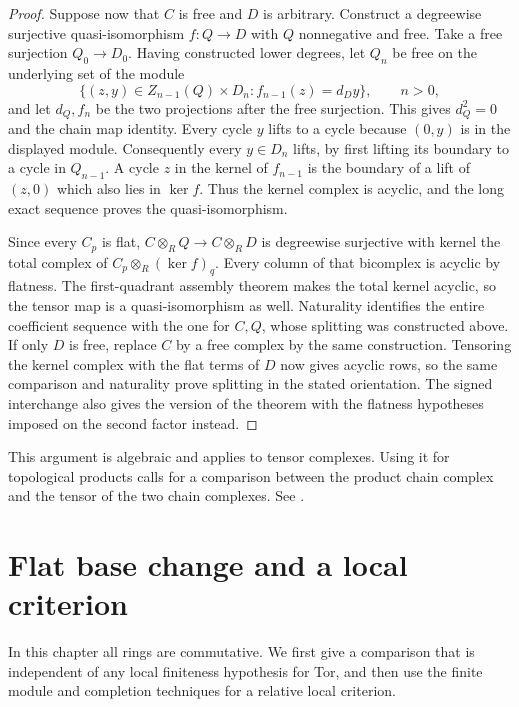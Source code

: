 \documentclass[11pt,oneside,openany]{book}
\theoremstyle{definition}
\theoremstyle{remark}
\begin{document}
\begin{proof}
Suppose now that \(C\) is free and \(D\) is arbitrary.
Construct a degreewise surjective quasi-isomorphism
\(f:Q\to D\) with \(Q\) nonnegative and free.
Take a free surjection \(Q_0\to D_0\). Having constructed
lower degrees, let \(Q_n\) be free on the underlying
set of the module
\[
 \{(z,y)\in Z_{n-1}(Q)\times D_n:
       f_{n-1}(z)=d_D y\},\qquad n>0,
\]
and let \(d_Q,f_n\) be the two projections after the
free surjection. This gives \(d_Q^2=0\) and the chain
map identity. Every cycle \(y\) lifts to a cycle because
\((0,y)\) is in the displayed module. Consequently
every \(y\in D_n\) lifts, by first lifting its boundary
to a cycle in \(Q_{n-1}\). A cycle \(z\) in the kernel
of \(f_{n-1}\) is the boundary of a lift of \((z,0)\)
which also lies in \(\ker f\). Thus the kernel complex
is acyclic, and the long exact sequence proves the
quasi-isomorphism.

Since every \(C_p\) is flat, \(C\otimes_R Q\to C\otimes_R D\)
is degreewise surjective with kernel the total complex
of \(C_p\otimes_R(\ker f)_q\). Every column of that
bicomplex is acyclic by flatness. The first-quadrant
assembly theorem makes the total kernel acyclic, so the
tensor map is a quasi-isomorphism as well. Naturality
identifies the entire coefficient sequence with the
one for \(C,Q\), whose splitting was constructed above.
If only \(D\) is free, replace \(C\) by a free complex
by the same construction. Tensoring the kernel complex
with the flat terms of \(D\) now gives acyclic rows,
so the same comparison and naturality prove splitting
in the stated orientation. The signed interchange also
gives the version of the theorem with the flatness
hypotheses imposed on the second factor instead.
\end{proof}

This argument is algebraic and applies to tensor complexes.
Using it for topological products calls for a comparison between
the product chain complex and the tensor of the two chain
complexes. See \cite[Theorem 3.6.3]{weibel}.
\chapter[Flat base change and a local criterion]
{Flat base change and a local criterion}
\label{p103:ch12}

In this chapter all rings are commutative. We first give a
comparison that is independent of any local finiteness
hypothesis for Tor, and then use the finite module and
completion techniques for a relative local criterion.
\end{document}
